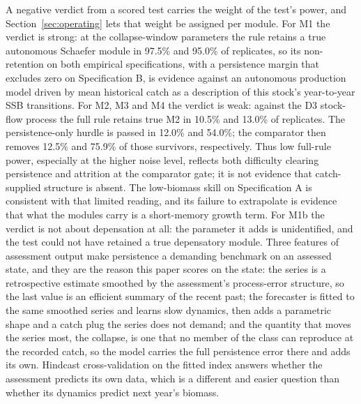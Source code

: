 A negative verdict from a scored test carries the weight of the test's power, and Section~\ref{sec:operating} lets that weight be assigned per module. For M1 the verdict is strong: at the collapse-window parameters the rule retains a true autonomous Schaefer module in 97.5\% and 95.0\% of replicates, so its non-retention on both empirical specifications, with a persistence margin that excludes zero on Specification B, is evidence against an autonomous production model driven by mean historical catch as a description of this stock's year-to-year SSB transitions. For M2, M3 and M4 the verdict is weak: against the D3 stock-flow process the full rule retains true M2 in 10.5\% and 13.0\% of replicates. The persistence-only hurdle is passed in 12.0\% and 54.0\%; the comparator then removes 12.5\% and 75.9\% of those survivors, respectively. Thus low full-rule power, especially at the higher noise level, reflects both difficulty clearing persistence and attrition at the comparator gate; it is not evidence that catch-supplied structure is absent. The low-biomass skill on Specification A is consistent with that limited reading, and its failure to extrapolate is evidence that what the modules carry is a short-memory growth term. For M1b the verdict is not about depensation at all: the parameter it adds is unidentified, and the test could not have retained a true depensatory module. Three features of assessment output make persistence a demanding benchmark on an assessed state, and they are the reason this paper scores on the state: the series is a retrospective estimate smoothed by the assessment's process-error structure, so the last value is an efficient summary of the recent past; the forecaster is fitted to the same smoothed series and learns slow dynamics, then adds a parametric shape and a catch plug the series does not demand; and the quantity that moves the series most, the collapse, is one that no member of the class can reproduce at the recorded catch, so the model carries the full persistence error there and adds its own. Hindcast cross-validation on the fitted index \citep{Kell2016,Kell2021,Carvalho2021} answers whether the assessment predicts its own data, which is a different and easier question than whether its dynamics predict next year's biomass.
